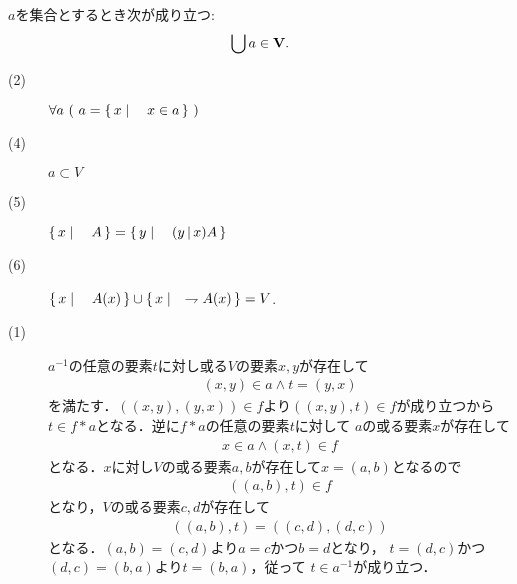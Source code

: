 	
	\begin{screen}
		\begin{axm}[合併集合の公理]
			$a$を集合とするとき次が成り立つ:
			\begin{align}
				\bigcup a \in \mathbf{V}.
			\end{align}
		\end{axm}
	\end{screen}
	
	\begin{screen}
		\begin{thm}\mbox{}
			\begin{description}
				\item[(2)] $\forall a\ (\ a = \Set{x}{x \in a}\ )$
				\item[(4)] $a \subset V$
				\item[(5)] $\left\{\, x \mid \quad A\, \right\} = \left\{\, y \mid \quad (y\, |\, x)A\, \right\}$
				\item[(6)] $\left\{\, x \mid \quad A(x)\, \right\} \cup \left\{\, x \mid \quad \rightharpoondown A(x)\, \right\} = V$.
			\end{description}
		\end{thm}
	\end{screen}
	
	\begin{screen}
		\begin{thm}
			
		\end{thm}
	\end{screen}
	
	\begin{prf}\mbox{}
		\begin{description}
			\item[(1)] $a^{-1}$の任意の要素$t$に対し或る$V$の要素$x,y$が存在して
				\begin{align}
					(x,y) \in a \wedge t = (y,x)
				\end{align}
				を満たす．$((x,y),(y,x)) \in f$より$((x,y),t) \in f$が成り立つから
				$t \in f \ast a$となる．逆に$f \ast a$の任意の要素$t$に対して
				$a$の或る要素$x$が存在して
				\begin{align}
					x \in a \wedge (x,t) \in f
				\end{align}
				となる．$x$に対し$V$の或る要素$a,b$が存在して$x=(a,b)$となるので
				\begin{align}
					((a,b),t) \in f
				\end{align}
				となり，$V$の或る要素$c,d$が存在して
				\begin{align}
					((a,b),t) = ((c,d),(d,c))
				\end{align}
				となる．$(a,b) = (c,d)$より$a=c$かつ$b=d$となり，
				$t = (d,c)$かつ$(d,c)=(b,a)$より$t=(b,a)$，従って
				$t \in a^{-1}$が成り立つ．
		\end{description}
	\end{prf}